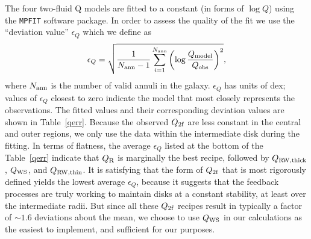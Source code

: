\documentclass[12pt,preprint]{aastex}
\begin{document}
The four two-fluid Q  models  are fitted to a constant (in forms of $\log Q$) using the {\tt MPFIT} software package.  
In order to assess the quality of the fit we use the ``deviation value'' $\epsilon_Q$ which we define as 
\begin{equation}
\label{eq_epsilon_Q}
\epsilon_Q= \sqrt{ \frac{1}{N_{\rm ann}-1} \sum_{i=1}^{N_{\rm ann}} \left(\log \frac{Q_{\rm model}}{Q_{\rm obs}}\right) ^2       }  ,                    
\end{equation}
where $N_{\rm ann}$ is the number of valid annuli in the galaxy. $\epsilon_Q$ has units of dex; values of $\epsilon_Q$ closest to zero indicate the model that most closely represents the observations.  The fitted values and their corresponding deviation values are shown in Table~\ref{qerr}.  Because the observed $Q_{\rm 2f}$ are less constant in the central and outer regions, we only use the data within the intermediate disk during the fitting.  In terms of flatness, the average $\epsilon_Q$ listed at the bottom of the Table~\ref{qerr} indicate that $Q_{\rm R}$ is marginally the best recipe, followed by $Q_{\rm RW,thick}$, $Q_{\rm WS}$, and $Q_{\rm RW,thin}$. It is satisfying that the form of $Q_{\rm 2f}$ that is most rigorously defined yields the lowest average $\epsilon_Q$, because it suggests that the feedback processes are truly working to maintain disks at a constant stability, at least over the intermediate radii.  But since all these $Q_{\rm 2f}$ recipes result in typically a factor of $\sim 1.6$ deviations about the mean, we choose to use $Q_{\rm WS}$ in our calculations as the easiest to implement, and sufficient for our purposes.
\end{document}
